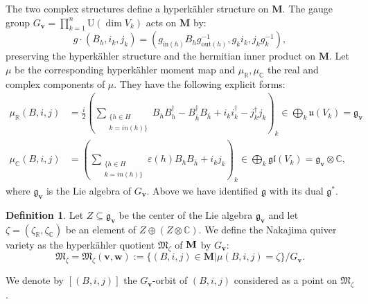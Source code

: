 \documentclass[12pt,oneside,reqno]{amsart}
\theoremstyle{definition}
\newtheorem{definition}[theorem]{Definition}
\numberwithin{equation}{section}
\numberwithin{theorem}{section}
\newcommand{\R}{\mathbb{R}}
\newcommand{\C}{\mathbb{C}}
\renewcommand{\subset}{\subseteq}
\newcommand{\eps}{\varepsilon}
\renewcommand{\d}[1]{\ensuremath{\operatorname{d}\!{#1}}}
\renewcommand{\d}{\dagger}
\newcommand{\hb}{\bar{h}}
\renewcommand{\dim}{\operatorname{dim}}
\begin{document}
The two complex structures define a hyperk\"ahler structure on $\mathbf{M}$. The gauge group $G_{\mathbf{v}}=\prod_{k=1}^{n} \mathrm{U}(\dim V_k)$ acts on $\mathbf{M}$ by:
%
\begin{equation*}
   g \cdot  (B_h,i_k,j_k)= (g_{\text{in}(h)}B_h g_{\text{out}(h)}^{-1},g_ki_k,j_kg_k^{-1}),
\end{equation*}
preserving the hyperk\"ahler structure and the hermitian inner product on $\mathbf{M}$.
Let $\mu $ be the corresponding hyperk\"ahler moment map and $\mu_\R,\mu_\C$ the real and complex components of $\mu$. They have the following explicit forms:
%
\begin{equation}
\begin{split}
    \mu_\R (B,i,j)&=\frac{i}{2}\left(\sum \limits_{\substack{\{ h \in H\\ k=in(h)\}}} B_hB_h^\d-B_{\hb}^\d B_{\hb}+i_ki_k^\d -j_k^\d j_k\right)_k \in \bigoplus _k \mathfrak{u}(V_k)=\mathfrak{g}_{\mathbf{v}} \\
    \mu_\C(B,i,j)&=\left(\sum \limits_{\substack{\{ h \in H\\ k=in(h)\}}} \eps(h)B_hB_{\hb}+i_kj_k \right)_k \in \bigoplus _k \mathfrak{gl}(V_k)=\mathfrak{g}_{\mathbf{v}}\otimes \C,
\end{split}
\end{equation}
%
where $\mathfrak{g}_{\mathbf{v}}$ is the Lie algebra of $G_{\mathbf{v}}$. Above we have identified $\mathfrak{g}$ with its dual $\mathfrak{g^*}$.
%
\begin{definition}
    Let $Z\subset \mathfrak{g}_{\mathbf{v}}$ be the center of the Lie algebra $\mathfrak{g}_{\mathbf{v}}$ and let $\zeta =(\zeta_\R,\zeta_\C)$ be an element of $Z\oplus (Z\otimes \C)$. We define the Nakajima quiver variety as the hyperk\"ahler quotient $\mathfrak{M}_\zeta$ of $\bold M$ by $G_{\mathbf{v}}$:
    \begin{equation}
        \mathfrak{M}_\zeta =\mathfrak{M}_{\zeta}(\mathbf v, \mathbf w):= \{(B,i,j) \in \mathbf M | \mu (B,i,j)=\zeta\}/G_{\mathbf{v}}.
    \end{equation}
\end{definition}
%
We denote by $[(B,i,j)]$ the $G_{\mathbf{v}}$-orbit of $(B,i,j)$ considered as a point on $\mathfrak{M}_\zeta$.
\end{document}
